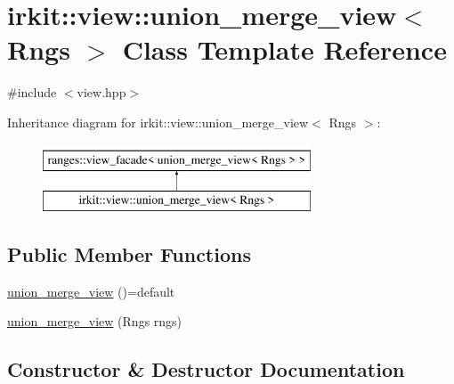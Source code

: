 \hypertarget{classirkit_1_1view_1_1union__merge__view}{}\section{irkit\+:\+:view\+:\+:union\+\_\+merge\+\_\+view$<$ Rngs $>$ Class Template Reference}
\label{classirkit_1_1view_1_1union__merge__view}


{\ttfamily \#include $<$view.\+hpp$>$}

Inheritance diagram for irkit\+:\+:view\+:\+:union\+\_\+merge\+\_\+view$<$ Rngs $>$\+:\begin{figure}[H]
\begin{center}
\leavevmode
\includegraphics[height=2.000000cm]{classirkit_1_1view_1_1union__merge__view}
\end{center}
\end{figure}
\subsection*{Public Member Functions}
\begin{DoxyCompactItemize}
\item 
\mbox{\hyperlink{classirkit_1_1view_1_1union__merge__view_a4a0c577e38ae0f12f3c8638911ff0e30}{union\+\_\+merge\+\_\+view}} ()=default
\item 
\mbox{\hyperlink{classirkit_1_1view_1_1union__merge__view_af2e80cdce25cdfd8db01a868a4dbf964}{union\+\_\+merge\+\_\+view}} (Rngs rngs)
\end{DoxyCompactItemize}


\subsection{Constructor \& Destructor Documentation}
\mbox{\label{classirkit_1_1view_1_1union__merge__view_a4a0c577e38ae0f12f3c8638911ff0e30}} 
